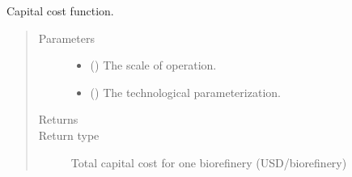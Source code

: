 \documentclass[letterpaper,10pt,english]{sphinxmanual}
\begin{document}
\begin{fulllineitems}
\label{\detokenize{technology:technology.tutorial_biorefinery.capital_cost}}
Capital cost function.
\begin{quote}\begin{description}
\item[{Parameters}] \leavevmode\begin{itemize}
\item {} 
 () \textendash{} The scale of operation.

\item {} 
 () \textendash{} The technological parameterization.

\end{itemize}

\item[{Returns}] \leavevmode


\item[{Return type}] \leavevmode
Total capital cost for one biorefinery (USD/biorefinery)

\end{description}\end{quote}

\end{fulllineitems}

\end{document}
